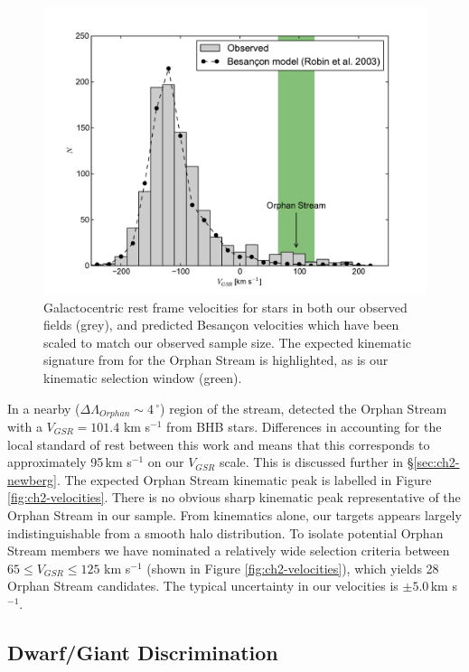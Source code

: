 \begin{figure}[h]
	\includegraphics[width=\columnwidth]{./chapter2/fig1.pdf}
	\caption{Galactocentric rest frame velocities for stars in both our observed fields (grey), and predicted Besan\c{c}on velocities which have been scaled to match our observed sample size. The expected kinematic signature from \citet{Newberg_et-al_2010} for the Orphan Stream is highlighted, as is our kinematic selection window (green).}
	\label{fig:velocities}
\end{figure}
 

In a nearby ($\Delta\Lambda_{Orphan} \sim 4\,^\circ$) region of the stream, \citet{Newberg_et-al_2010} detected the Orphan Stream with a $V_{GSR} = 101.4$ km s$^{-1}$ from BHB stars. Differences in accounting for the local standard of rest between this work and \citet{Newberg_et-al_2010} means that this corresponds to approximately 95\,km s$^{-1}$ on our $V_{GSR}$ scale.  This is discussed further in \S\ref{sec:ch2-newberg}. The expected Orphan Stream kinematic peak is labelled in Figure \ref{fig:ch2-velocities}. There is no obvious sharp kinematic peak representative of the Orphan Stream in our sample. From kinematics alone, our targets appears largely indistinguishable from a smooth halo distribution. To isolate potential Orphan Stream members we have nominated a relatively wide selection criteria between $65 \leq V_{GSR} \leq 125$ km s$^{-1}$ (shown in Figure \ref{fig:ch2-velocities}), which yields 28 Orphan Stream candidates. The typical uncertainty in our velocities is $\pm{}5.0$\,km s$^{-1}$.

\subsection{Dwarf/Giant Discrimination}
\label{sec:ch2-dwarf-giant}

